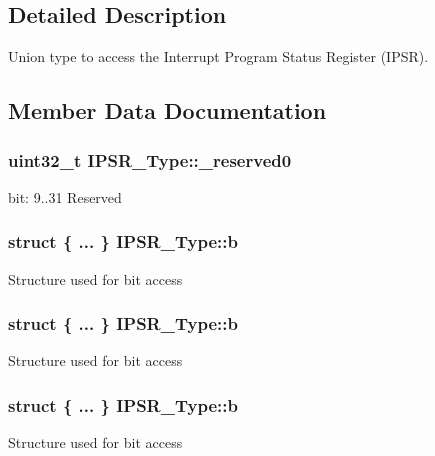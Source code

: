\subsection{Detailed Description}
Union type to access the Interrupt Program Status Register (I\+P\+SR). 

\subsection{Member Data Documentation}
\subsubsection[{\texorpdfstring{\+\_\+reserved0}{_reserved0}}]{\setlength{\rightskip}{0pt plus 5cm}uint32\+\_\+t I\+P\+S\+R\+\_\+\+Type\+::\+\_\+reserved0}\hypertarget{unionIPSR__Type_ad2eb0a06de4f03f58874a727716aa9aa}{}\label{unionIPSR__Type_ad2eb0a06de4f03f58874a727716aa9aa}
bit\+: 9..31 Reserved 
\subsubsection[{\texorpdfstring{b}{b}}]{\setlength{\rightskip}{0pt plus 5cm}struct \{ ... \}   I\+P\+S\+R\+\_\+\+Type\+::b}\hypertarget{unionIPSR__Type_aa11b32974d63dd51990089397c4f00f6}{}\label{unionIPSR__Type_aa11b32974d63dd51990089397c4f00f6}
Structure used for bit access 
\subsubsection[{\texorpdfstring{b}{b}}]{\setlength{\rightskip}{0pt plus 5cm}struct \{ ... \}   I\+P\+S\+R\+\_\+\+Type\+::b}\hypertarget{unionIPSR__Type_a119f0c37190e2d377093a8e200e1089c}{}\label{unionIPSR__Type_a119f0c37190e2d377093a8e200e1089c}
Structure used for bit access 
\subsubsection[{\texorpdfstring{b}{b}}]{\setlength{\rightskip}{0pt plus 5cm}struct \{ ... \}   I\+P\+S\+R\+\_\+\+Type\+::b}\hypertarget{unionIPSR__Type_a4cc022d3c6e4670c6e410968fe4edf06}{}\label{unionIPSR__Type_a4cc022d3c6e4670c6e410968fe4edf06}
Structure used for bit access 
